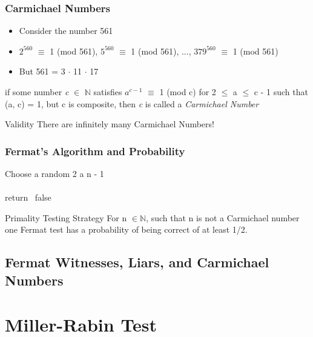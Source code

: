 \documentclass{beamer}
\begin{document}
\begin{frame}
\frametitle{Carmichael Numbers}
    \begin{itemize}
        \item Consider the number 561
        \item $2^{560}$ $\equiv$ 1 (mod 561), $5^{560}$ $\equiv$ 1 (mod 561), ..., $379^{560}$ $\equiv$ 1 (mod 561)
        \item But 561 = 3 $\cdot$ 11 $\cdot$ 17 
    \end{itemize}
    \begin{definition}
        if some number \textit{c} $\in$ $\mathbb{N}$ satisfies $a^{c-1}$ $\equiv$ 1 (mod c) for 2 $\leq$ a $\leq$ c - 1 such that (a, c) = 1, but c is composite, then \textit{c} is called a \textit{Carmichael Number}
    \end{definition}
    \begin{alertblock}{Validity}
        There are infinitely many Carmichael Numbers!
    \end{alertblock}
\end{frame}

\begin{frame}
\frametitle{Fermat's Algorithm and Probability}

\begin{algorithm2e}

    \SetAlgoLined
    
    Choose a random 2 \leq  a \leq n - 1 \\
     { \\
         {return \  false}
    }
\end{algorithm2e}
\begin{block}{Primality Testing Strategy}
    For n $\in \mathbb{N}$, such that n is not a Carmichael number one Fermat test has a probability of being correct of at least 1/2. 
\end{block}
\end{frame}

\subsection{Fermat Witnesses, Liars, and Carmichael Numbers}

\section{Miller-Rabin Test}
\end{document}
